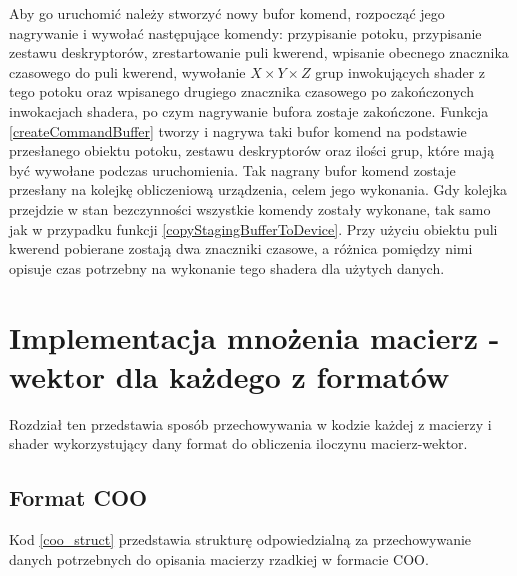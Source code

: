 Aby go uruchomić należy stworzyć nowy bufor komend, rozpocząć jego nagrywanie i wywołać następujące komendy: przypisanie potoku, przypisanie zestawu deskryptorów, zrestartowanie puli kwerend, wpisanie obecnego znacznika czasowego do puli kwerend, wywołanie $X \times Y \times Z$ grup inwokujących shader z tego potoku oraz wpisanego drugiego znacznika czasowego po zakończonych inwokacjach shadera, po czym nagrywanie bufora zostaje zakończone.
Funkcja \ref{createCommandBuffer} tworzy i nagrywa taki bufor komend na podstawie przesłanego obiektu potoku, zestawu deskryptorów oraz ilości grup, które mają być wywołane podczas uruchomienia.
Tak nagrany bufor komend zostaje przesłany na kolejkę obliczeniową urządzenia, celem jego wykonania. Gdy kolejka przejdzie w stan bezczynności wszystkie komendy zostały wykonane, tak samo jak w przypadku funkcji \ref{copyStagingBufferToDevice}.
Przy użyciu obiektu puli kwerend pobierane zostają dwa znaczniki czasowe, a różnica pomiędzy nimi opisuje czas potrzebny na wykonanie tego shadera dla użytych danych.

\section{Implementacja mnożenia macierz - wektor dla każdego z formatów }
\label{cha:impl_matrix_vec}

Rozdział ten przedstawia sposób przechowywania w kodzie każdej z macierzy i shader wykorzystujący dany format do obliczenia iloczynu macierz-wektor.

\subsection{Format COO}
\label{cha:coo_impl}

Kod \ref{coo_struct} przedstawia strukturę odpowiedzialną za przechowywanie danych potrzebnych do opisania macierzy rzadkiej w formacie COO.

